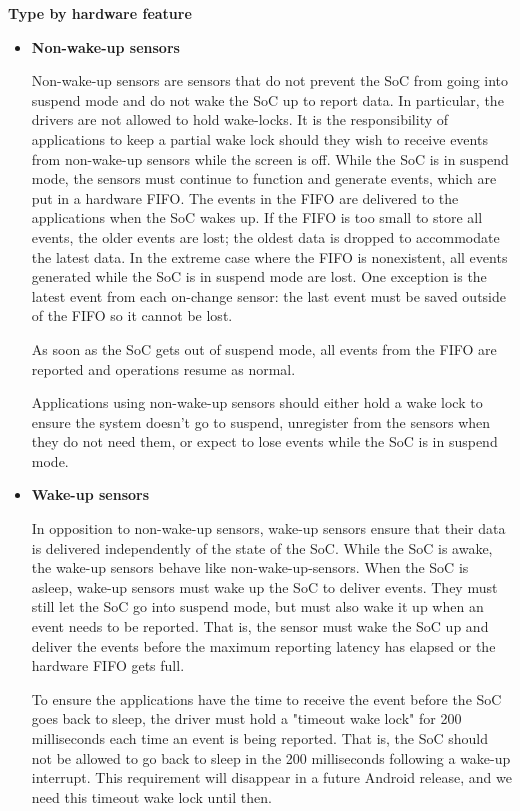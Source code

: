 \documentclass{article}
\begin{document}
\textbf{Type by hardware feature}
\begin{itemize}
\item \textbf{Non-wake-up sensors}

  Non-wake-up sensors are sensors that do not prevent the SoC from going into
  suspend mode and do not wake the SoC up to report data. In particular, the
  drivers are not allowed to hold wake-locks. It is the responsibility of
  applications to keep a partial wake lock should they wish to receive events
  from non-wake-up sensors while the screen is off. While the SoC is in suspend
  mode, the sensors must continue to function and generate events, which are put
  in a hardware FIFO.
  The events in the FIFO are delivered to the applications when the SoC wakes
  up. If the FIFO is too small to store all events, the older events are lost;
  the oldest data is dropped to accommodate the latest data. In the extreme case
  where the FIFO is nonexistent, all events generated while the SoC is in
  suspend mode are lost. One exception is the latest event from each on-change
  sensor: the last event must be saved outside of the FIFO so it cannot be lost.

  As soon as the SoC gets out of suspend mode, all events from the FIFO are
  reported and operations resume as normal.

  Applications using non-wake-up sensors should either hold a wake lock to
  ensure the system doesn't go to suspend, unregister from the sensors when they
  do not need them, or expect to lose events while the SoC is in suspend mode.

\item \textbf{Wake-up sensors}

  In opposition to non-wake-up sensors, wake-up sensors ensure that their data
  is delivered independently of the state of the SoC. While the SoC is awake,
  the wake-up sensors behave like non-wake-up-sensors. When the SoC is asleep,
  wake-up sensors must wake up the SoC to deliver events. They must still let
  the SoC go into suspend mode, but must also wake it up when an event needs to
  be reported. That is, the sensor must wake the SoC up and deliver the events
  before the maximum reporting latency has elapsed or the hardware FIFO gets
  full. %

  To ensure the applications have the time to receive the event before the SoC
  goes back to sleep, the driver must hold a "timeout wake lock" for 200
  milliseconds each time an event is being reported. That is, the SoC should not
  be allowed to go back to sleep in the 200 milliseconds following a wake-up
  interrupt. This requirement will disappear in a future Android release, and we
  need this timeout wake lock until then.
\end{itemize}
\end{document}
